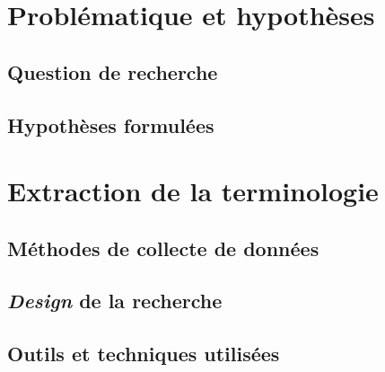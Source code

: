 \documentclass[xcolor={table,usenames,dvipsnames}]{beamer}
\begin{document}




\section[Problématique et hypothèses]{Problématique et hypothèses}
\subsection[Question de recherche]{Question de recherche}




\subsection[Hypothèses formulées]{Hypothèses formulées}




\section{Extraction de la terminologie}

\subsection[Méthodes de collecte de donnée]{Méthodes de collecte de données}


\subsection[\textit{Design} de la recherche]{\textit{Design} de la recherche}





\subsection[Outils et techniques utilisées]{Outils et techniques utilisées}



\end{document}

